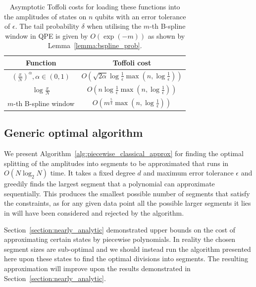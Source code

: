 \documentclass[a4paper,twocolumn,,accepted=2025-05-27]{quantumarticle}
\theoremstyle{empty}
\begin{document}
\begin{table}[hbtp]
            \centering
            
            \begin{tabular}{|c|c|}
            \hline
            Function & Toffoli cost \\ \hline\hline
                \rule{0pt}{1.25em}$\left(\frac{x}{N}\right)^{\alpha}, \alpha \in (0,1)$ &  $O\left(\sqrt{2\alpha} \log \frac{1}{\epsilon}\max(n, \log\frac{1}{\epsilon})\right)$ \\[0.5em] \hline
                \rule{0pt}{1.25em}$\log \frac{x}{N}$ &  $O\left(n\log \frac{1}{\epsilon}\max(n, \log\frac{1}{\epsilon})\right)$ \\[0.5em] \hline
                \rule{0pt}{1.25em}$m$-th B-spline window & $O\left(m^{\frac{5}{4}}\max \left(n, \log \frac{1}{\epsilon}\right)\right)$ \\[0.5em] \hline
            \end{tabular}
            
            \caption{\label{tab:resource_costs}Asymptotic Toffoli costs for loading these functions into the amplitudes of states on $n$ qubits with an error tolerance of $\epsilon$. The tail probability $\delta$ when utilising the $m$-th B-spline window in QPE is given by $O(\exp (-m))$ as shown by Lemma~\ref{lemma:bspline_prob}.}
        \end{table}

\subsection{Generic optimal algorithm}
\label{section:algorithm}
We present Algorithm~\ref{alg:piecewise_classical_approx} for finding the optimal splitting of the amplitudes into segments to be approximated that runs in $O(N \log_2 N)$ time. It takes a fixed degree $d$ and maximum error tolerance $\epsilon$ and greedily finds the largest segment that a polynomial can approximate sequentially. This produces the smallest possible number of segments that satisfy the constraints, as for any given data point all the possible larger segments it lies in will have been considered and rejected by the algorithm. 

Section~\ref{section:nearly_analytic} demonstrated upper bounds on the cost of approximating certain states by piecewise polynomials. In reality the chosen segment sizes are sub-optimal and we should instead run the algorithm presented here upon these states to find the optimal divisions into segments. The resulting approximation will improve upon the results demonstrated in Section~\ref{section:nearly_analytic}. 
\end{document}
